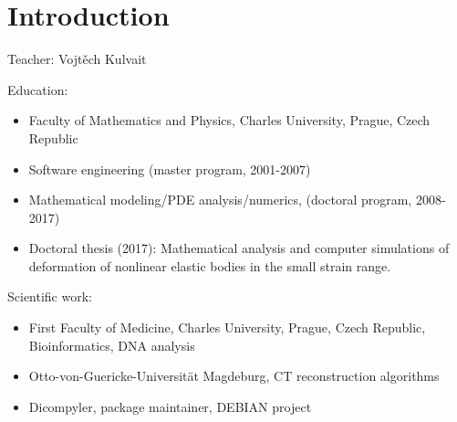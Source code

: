 \section{Introduction}

\begin{frame}{Teacher: Vojt\v{e}ch Kulvait}
\footnotesize{
Education:
        \begin{itemize}
	\item Faculty of Mathematics and Physics, Charles University, \newline Prague, Czech Republic
	\item Software engineering (master program, 2001-2007)
	\item Mathematical modeling/PDE analysis/numerics, \newline (doctoral program, 2008-2017)
	\item Doctoral thesis (2017): Mathematical analysis and computer simulations of deformation of nonlinear elastic bodies in the small strain range.
	\end{itemize}
Scientific work:
\begin{itemize}
	\item First Faculty of Medicine, Charles University, Prague, Czech Republic, Bioinformatics, DNA analysis
	\item Otto-von-Guericke-Universit\"at Magdeburg, CT reconstruction algorithms
	\item Dicompyler, package maintainer, DEBIAN project
\end{itemize}
}
\end{frame}



